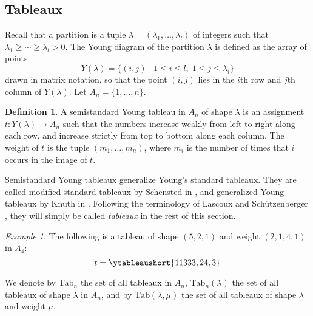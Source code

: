 \documentclass[10pt]{amsproc}
\theoremstyle{definition}
\newtheorem{definition}[theorem]{Definition}
\theoremstyle{remark}
\newtheorem{example}[theorem]{Example}
\newcommand{\Tab}{\mathrm{Tab}}
\begin{document}
\subsection{Tableaux}
\label{sec:tableaux}
Recall that a partition is a tuple $\lambda=(\lambda_1,\dotsc,\lambda_l)$ of integers such that $\lambda_1\geq \dotsb\geq \lambda_l>0$.
The Young diagram of the partition $\lambda$ is defined as the array of points
\begin{displaymath}
Y(\lambda)=\{(i,j)\mid 1\leq i\leq l,\;1\leq j\leq \lambda_i\}
\end{displaymath}
drawn in matrix notation, so that the point $(i,j)$ lies in the $i$th row and $j$th column of $Y(\lambda)$.
Let $A_n=\{1,\dotsc,n\}$.
\begin{definition}
  A semistandard Young tableau in $A_n$ of shape $\lambda$ is an assignment $t:Y(\lambda)\to A_n$ such that the numbers increase weakly from left to right along each row, and increase strictly from top to bottom along each column.
  The weight of $t$ is the tuple $(m_1,\dotsc, m_n)$, where $m_i$ is the number of times that $i$ occurs in the image of $t$.
\end{definition}
Semistandard Young tableaux generalize Young's standard tableaux. They are called modified standard tableaux by Schensted in \cite{schensted}, and generalized Young tableaux by Knuth in \cite{knuth}.
Following the terminology of Lascoux and Sch\"utzenberger \cite{plaxique}, they will simply be called \emph{tableaux} in the rest of this section.
\begin{example}
  \label{example:ssyt}
  The following is a tableau of shape $(5,2,1)$ and weight $(2,1,4,1)$ in $A_4$:
  \begin{displaymath}
    t=\ytableaushort{11333,24,3}
  \end{displaymath}
\end{example}
We denote by $\Tab_n$ the set of all tableaux in $A_n$, $\Tab_n(\lambda)$ the set of all tableaux of shape $\lambda$ in $A_n$, and by $\Tab(\lambda,\mu)$ the set of all tableaux of shape $\lambda$ and weight $\mu$.
\end{document}
